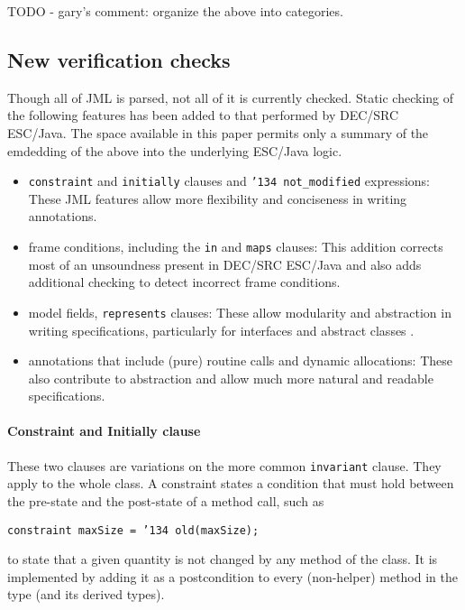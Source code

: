 \documentclass{sig-alternate}
\begin{document}
TODO - gary's comment: organize the above into categories.

\subsection{New verification checks}
Though all of JML is parsed, not all of it is currently checked.
Static checking of the following features has been added to that performed by
DEC/SRC ESC/Java.  The space available in this paper permits only a summary of the emdedding of the above into the underlying ESC/Java logic.  
\setlength{\partopsep}{0in}\setlength{\parskip}{0in}\setlength{\itemsep}{0in}\setlength{\topsep}{0in}
\begin{itemize}
\setlength{\partopsep}{0in}\setlength{\parskip}{0in}\setlength{\itemsep}{0in}\setlength{\topsep}{0in}
\item \texttt{constraint} and \texttt{initially} clauses and \texttt{\char'134 not\_modified} expressions: These JML features allow more flexibility and conciseness in writing annotations.
\item frame conditions, including the \texttt{in} and \texttt{maps} clauses:  This addition corrects
most of an unsoundness present in DEC/SRC ESC/Java and also adds additional checking to detect
incorrect frame conditions.
\item model fields, \texttt{represents} clauses: These allow modularity and abstraction in
writing specifications, particularly for interfaces and abstract classes \cite{Cheon-etal03}.
\item annotations that include (pure) routine calls and dynamic allocations: These also contribute
to abstraction and allow much more natural and readable specifications.
\end{itemize}


\paragraph*{Constraint and Initially clause}
These two clauses are variations on the more common \texttt{invariant} clause.  They apply to the whole class.  A constraint states a condition that must hold between the pre-state and the post-state of a method call, such as
\begin{center}
\texttt{constraint maxSize = \char'134 old(maxSize); }
\end{center}
to state that a given quantity is not changed by any method of the class.  It is implemented by 
adding it as a postcondition to every (non-helper) method in the type (and its derived types).
\end{document}
